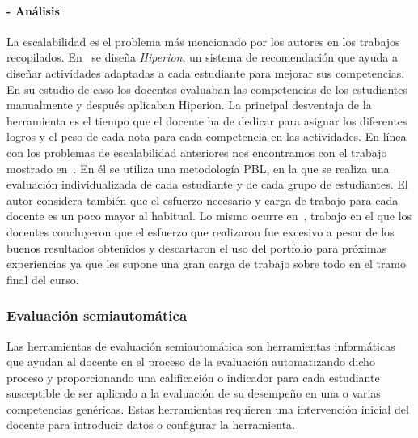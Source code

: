 \paragraph*{- Análisis}
La escalabilidad es el problema más mencionado por los autores en los trabajos recopilados. En~\cite{serrano2013hiperion} se diseña \emph{Hiperion}, un sistema de recomendación que ayuda a diseñar actividades adaptadas a cada estudiante para mejorar sus competencias. En su estudio de caso los docentes evaluaban las competencias de los estudiantes manualmente y después aplicaban Hiperion. La principal desventaja de la herramienta es el tiempo que el docente ha de dedicar para asignar los diferentes logros y el peso de cada nota para cada competencia en las actividades. En línea con los problemas de escalabilidad anteriores nos encontramos con el trabajo mostrado en~\cite{lacuesta2009active}. En él se utiliza una metodología PBL, en la que se realiza una evaluación individualizada de cada estudiante y de cada grupo de estudiantes. El autor considera también que el esfuerzo necesario y carga de trabajo para cada docente es un poco mayor al habitual. Lo mismo ocurre en~\cite{benlloch2007adapting}, trabajo en el que los docentes concluyeron que el esfuerzo que realizaron fue excesivo a pesar de los buenos resultados obtenidos y descartaron el uso del portfolio para próximas experiencias ya que les supone una gran carga de trabajo sobre todo en el tramo final del curso.

\subsubsection*{Evaluación semiautomática}

Las herramientas de evaluación semiautomática son herramientas informáticas que ayudan al docente en el proceso de la evaluación automatizando dicho proceso y proporcionando una calificación o indicador para cada estudiante susceptible de ser aplicado a la evaluación de su desempeño en una o varias competencias genéricas. Estas herramientas requieren una intervención inicial del docente para introducir datos o configurar la herramienta. %

